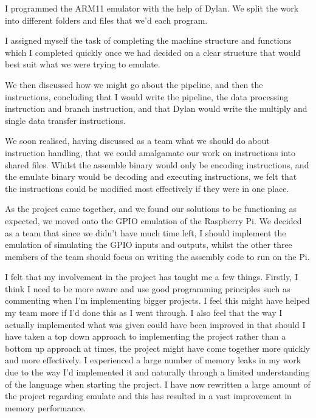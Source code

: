 I programmed the ARM11 emulator with the help of Dylan. We split the work into different folders and files that we'd each program.

I assigned myself the task of completing the machine structure and functions which I completed quickly once we had decided on a clear structure that would best suit what we were trying to emulate.

We then discussed how we might go about the pipeline, and then the instructions, concluding that I would write the pipeline, the data processing instruction and branch instruction, and that Dylan would write the multiply and single data transfer instructions.

We soon realised, having discussed as a team what we should do about instruction handling, that we could amalgamate our work on instructions into shared files. Whilst the assemble binary would only be encoding instructions, and the emulate binary would be decoding and executing instructions, we felt that the instructions could be modified most effectively if they were in one place.

As the project came together, and we found our solutions to be functioning as expected, we moved onto the GPIO emulation of the Raspberry Pi. We decided as a team that since we didn't have much time left, I should implement the emulation of simulating the GPIO inputs and outputs, whilst the other three members of the team should focus on writing the assembly code to run on the Pi.

I felt that my involvement in the project has taught me a few things. Firstly, I think I need to be more aware and use good programming principles such as commenting when I'm implementing bigger projects. I feel this might have helped my team more if I'd done this as I went through. I also feel that the way I actually implemented what was given could have been improved in that should I have taken a top down approach to implementing the project rather than a bottom up approach at times, the project might have come together more quickly and more effectively. I experienced a large number of memory leaks in my work due to the way I'd implemented it and naturally through a limited understanding of the language when starting the project. I have now rewritten a large amount of the project regarding emulate and this has resulted in a vast improvement in memory performance.